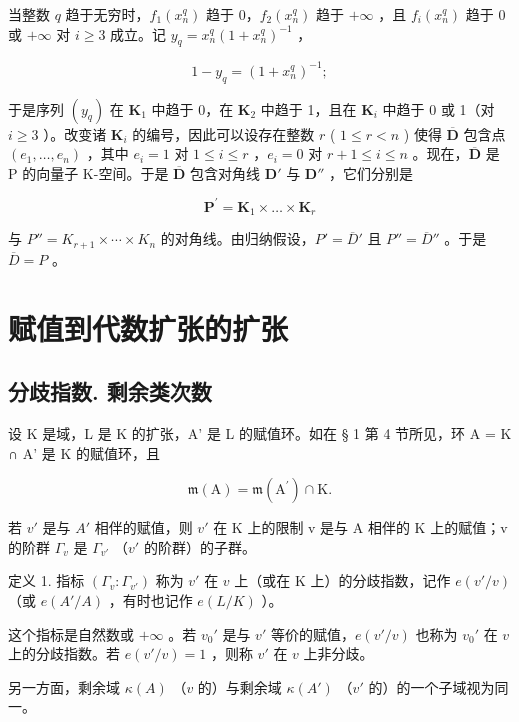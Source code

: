当整数 \(q\) 趋于无穷时，\(f_{1}(x_{n}^{q})\) 趋于 0，\(f_{2}(x_{n}^{q})\) 趋于 \(+\infty\) ，且 \(f_{i}(x_{n}^{q})\) 趋于 0 或 \(+\infty\) 对 \(i \geqslant 3\) 成立。记 \(y_{q} = x_{n}^{q}(1 + x_{n}^{q})^{-1}\) ，

\[
1 - y _ {q} = (1 + x _ {n} ^ {q}) ^ {- 1};
\]

于是序列 \((y_q)\) 在 \(\mathbf{K}_1\) 中趋于 0，在 \(\mathbf{K}_2\) 中趋于 1，且在 \(\mathbf{K}_i\) 中趋于 0 或 1（对 \(i \geqslant 3\) ）。改变诸 \(\mathbf{K}_i\) 的编号，因此可以设存在整数 \(r\) ( \(1 \leqslant r < n\) ) 使得 \(\overline{\mathbf{D}}\) 包含点 \((e_1, \ldots, e_n)\) ，其中 \(e_i = 1\) 对 \(1 \leqslant i \leqslant r\) ，\(e_i = 0\) 对 \(r + 1 \leqslant i \leqslant n\) 。现在，\(\overline{\mathbf{D}}\) 是 P 的向量子 K-空间。于是 \(\overline{\mathbf{D}}\) 包含对角线 \(\mathbf{D}'\) 与 \(\mathbf{D}''\) ，它们分别是

\[
\mathbf {P} ^ {\prime} = \mathbf {K} _ {1} \times \dots \times \mathbf {K} _ {r}
\]

与 \(P'' = K_{r+1} \times \cdots \times K_n\) 的对角线。由归纳假设，\(P' = \overline{D}'\) 且 \(P'' = \overline{D}''\) 。于是 \(\overline{D} = P\) 。

\section{赋值到代数扩张的扩张}

\subsection{分歧指数. 剩余类次数}

设 K 是域，L 是 K 的扩张，A' 是 L 的赋值环。如在 § 1 第 4 节所见，环 A = K ∩ A' 是 K 的赋值环，且

\[
\mathfrak {m} (\mathrm{A}) = \mathfrak {m} (\mathrm{A} ^ {\prime}) \cap \mathrm{K}.
\]

若 \(v'\) 是与 \(A'\) 相伴的赋值，则 \(v'\) 在 K 上的限制 v 是与 A 相伴的 K 上的赋值；v 的阶群 \(\Gamma_{v}\) 是 \(\Gamma_{v'}\) （\(v'\) 的阶群）的子群。

定义 1. 指标 \((\Gamma_v: \Gamma_{v'})\) 称为 \(v'\) 在 \(v\) 上（或在 K 上）的分歧指数，记作 \(e(v'/v)\) （或 \(e(A'/A)\) ，有时也记作 \(e(L/K)\) ）。

这个指标是自然数或 \(+\infty\) 。若 \(v_0'\) 是与 \(v'\) 等价的赋值，\(e(v'/v)\) 也称为 \(v_0'\) 在 \(v\) 上的分歧指数。若 \(e(v'/v) = 1\) ，则称 \(v'\) 在 \(v\) 上非分歧。

另一方面，剩余域 \(\kappa(A)\) （\(v\) 的）与剩余域 \(\kappa(A')\) （\(v'\) 的）的一个子域视为同一。


